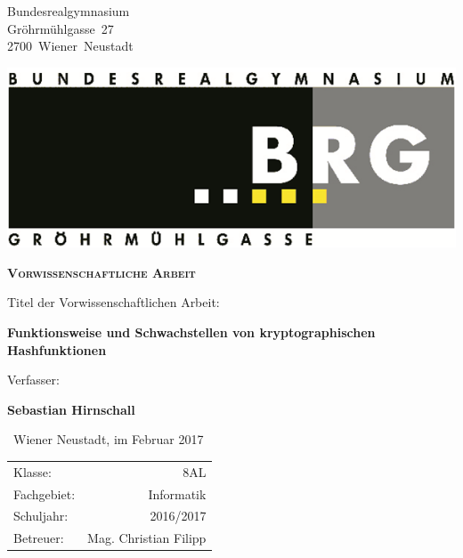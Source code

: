 \documentclass[12pt,a4paper]{scrartcl}
\author{Sebastian Hirnschall}
\date{\today}
\numberwithin{equation}{section}
\numberwithin{myalgctr}{section}
\numberwithin{mytheoremctr}{section}
\begin{document}
	\begin{titlepage}
		\centering
		\begin{flushright}
			\begin{minipage}{0.3\textwidth}
			\raggedleft
			Bundesrealgymnasium\\
			Gröhrmühlgasse~27\\
			2700~Wiener~Neustadt
			\end{minipage}
		\begin{minipage}{0.25\textwidth}
		\includegraphics[width=\linewidth]{brgg-logo}
	\end{minipage}
		\end{flushright}	
		
		\vspace{5cm}
		
		{\scshape\huge \textbf{Vorwissenschaftliche Arbeit}\par}
		\vspace{1.5cm}
		Titel der Vorwissenschaftlichen Arbeit: \par
		\vspace{0.5cm}
		{\large\bfseries Funktionsweise und Schwachstellen von kryptographischen Hashfunktionen\par}
		\vspace{2cm}
		Verfasser: \par
		\vspace{0.3cm}
		{\Large \textbf{Sebastian Hirnschall}\par}
		\vfill
		\begin{flushleft}
			$ \, $ Wiener Neustadt, im Februar 2017 \par
			\begin{tabular}{l r}
				Klasse:     & 8AL           \\
				Fachgebiet: & Informatik    \\
				Schuljahr:  & 2016/2017     \\
				Betreuer:   & Mag. Christian  Filipp\\
			\end{tabular}
		\end{flushleft}
		
		
		
		
	\end{titlepage}
	\restoregeometry
	
\end{document}
